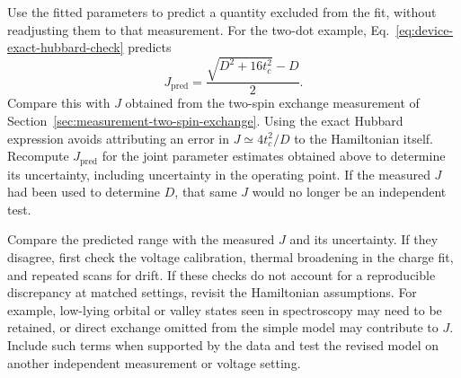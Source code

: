Use the fitted parameters to predict a quantity excluded from the
fit, without readjusting them to that measurement. For the two-dot
example, Eq.~\eqref{eq:device-exact-hubbard-check} predicts
\begin{equation}
 J_{\mathrm{pred}}
   =\frac{\sqrt{D^2+16t_c^2}-D}{2}.
 \label{eq:measurement-independent-exchange-prediction}
\end{equation}
Compare this with $J$ obtained from the two-spin exchange measurement
of Section~\ref{sec:measurement-two-spin-exchange}.
Using the exact Hubbard expression avoids attributing an error in
$J\simeq4t_c^2/D$ to the Hamiltonian itself. Recompute
$J_{\mathrm{pred}}$ for the joint parameter estimates obtained
above to determine its uncertainty, including uncertainty in the
operating point. If the measured $J$ had been used to determine
$D$, that same $J$ would no longer be an independent test.

Compare the predicted range with the measured $J$ and its
uncertainty. If they disagree, first check the voltage calibration,
thermal broadening in the charge fit, and repeated scans for drift.
If these checks do not account for a reproducible discrepancy at
matched settings, revisit the Hamiltonian assumptions.
For example, low-lying orbital or valley states seen
in spectroscopy may need to be retained, or direct exchange omitted
from the simple model may contribute to $J$. Include such terms
when supported by the data and test the revised model on another
independent measurement or voltage setting.
